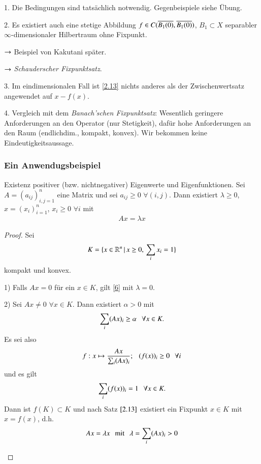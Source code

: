 \begin{remark}
    \begin{description}
    \item{1.}
    Die Bedingungen sind tatsächlich notwendig. Gegenbeispiele siehe Übung.
    \item{2.}
    Es existiert auch eine stetige Abbildung $f\in C(\overline{B_1(0)},\overline{B_1(0)})$, $B_1\subset X$ separabler
    $\infty$-dimensionaler Hilbertraum ohne Fixpunkt.
    \begin{description}
    \item{$\rightarrow$}
    Beispiel von Kakutani später.
    \item{$\rightarrow$}
    \textit{Schauderscher Fixpunktsatz}.
    \end{description}
    \item{3.}
    Im eindimensionalen Fall ist \ref{2.13} nichts anderes als der Zwischenwertsatz angewendet auf
    $x-f(x)$.
    \item{4.}
    Vergleich mit dem \textit{Banach'schen Fixpunktsatz}: Wesentlich geringere Anforderungen an den
    Operator (nur Stetigkeit), dafür hohe Anforderungen an den Raum (endlichdim., kompakt, konvex).
    Wir bekommen keine Eindeutigkeitsaussage.
    \end{description}
\end{remark}

\subsubsection*{Ein Anwendugsbeispiel}

Existenz positiver (bzw. nichtnegativer) Eigenwerte und Eigenfunktionen. Sei $A=(a_{ij})_{i,j=1}^n$ eine
Matrix und sei $a_{ij}\geq 0$ $\forall (i,j)$. Dann existiert $\lambda\geq 0$, $x=(x_i)_{i=1}^n$,
$x_i\geq 0$ $\forall i$ mit
\begin{align}\label{6}
    Ax=\lambda x
\end{align}

\begin{proof}
    Sei 
    \[
        K=\{ x\in \mathbb{R}^n \, |\, x\geq 0, \, \sum_{i}x_i=1 \}
    \]
    kompakt und konvex.
    \begin{description}
        \item{1)}
        Falls $Ax=0$ für ein $x\in K$, gilt \ref{6} mit $\lambda=0$.
        \item{2)}
        Sei $Ax\neq 0$ $\forall x\in K$. Dann existiert $\alpha>0$ mit
        \[
            \sum_i(Ax)_i\geq \alpha \hspace{.25cm} \forall x\in K.
        \]
        Es sei also
        \[
            f:x\mapsto \frac{Ax}{\sum_i (Ax)_i}; \hspace{.25cm} (f(x))_i \geq 0 \hspace{.25cm} \forall i
        \]
        und es gilt
        \[
            \sum_i (f(x))_i=1 \hspace{.25cm} \forall x\in K.
        \]
        Dann ist $f(K)\subset K$ und nach Satz $\ref{2.13}$ existiert ein Fixpunkt $x\in K$ mit $x=f(x)$,
        d.h.
        \[
            Ax=\lambda x \hspace{.25cm} \text{mit} \hspace{.25cm} \lambda =\sum_i(Ax)_i >0
        \]
    \end{description}\[ \]
\end{proof}

